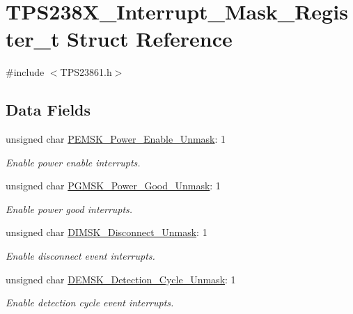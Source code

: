 \hypertarget{struct_t_p_s238_x___interrupt___mask___register__t}{\section{T\-P\-S238\-X\-\_\-\-Interrupt\-\_\-\-Mask\-\_\-\-Register\-\_\-t Struct Reference}
\label{struct_t_p_s238_x___interrupt___mask___register__t}
}


{\ttfamily \#include $<$T\-P\-S23861.\-h$>$}

\subsection*{Data Fields}
\begin{DoxyCompactItemize}
\item 
unsigned char \hyperlink{struct_t_p_s238_x___interrupt___mask___register__t_a46b9c1686cf168305e084943e4eeea0a}{P\-E\-M\-S\-K\-\_\-\-Power\-\_\-\-Enable\-\_\-\-Unmask}\-: 1
\begin{DoxyCompactList}\small\item\em Enable power enable interrupts. \end{DoxyCompactList}\item 
unsigned char \hyperlink{struct_t_p_s238_x___interrupt___mask___register__t_afe7ccff05d817d01188c24e49641a563}{P\-G\-M\-S\-K\-\_\-\-Power\-\_\-\-Good\-\_\-\-Unmask}\-: 1
\begin{DoxyCompactList}\small\item\em Enable power good interrupts. \end{DoxyCompactList}\item 
unsigned char \hyperlink{struct_t_p_s238_x___interrupt___mask___register__t_a43d19b300476b679579cf167815c790d}{D\-I\-M\-S\-K\-\_\-\-Disconnect\-\_\-\-Unmask}\-: 1
\begin{DoxyCompactList}\small\item\em Enable disconnect event interrupts. \end{DoxyCompactList}\item 
unsigned char \hyperlink{struct_t_p_s238_x___interrupt___mask___register__t_a7be273480b317c84a8cdffdd06893be5}{D\-E\-M\-S\-K\-\_\-\-Detection\-\_\-\-Cycle\-\_\-\-Unmask}\-: 1
\begin{DoxyCompactList}\small\item\em Enable detection cycle event interrupts. \end{DoxyCompactList}\item 

\end{DoxyCompactItemize}
